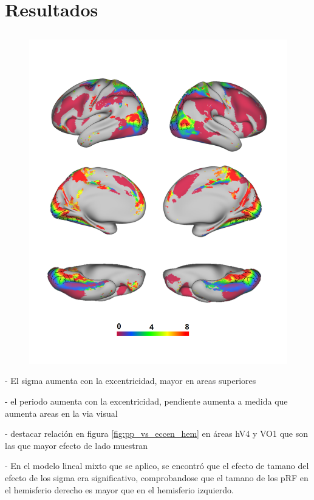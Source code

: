 \chapter{Resultados}\label{chapter:results}

\section{}


\begin{figure}
	\centering		
	\includegraphics[scale=0.3]{images/brain_eccen}
\end{figure}

- El sigma aumenta con la excentricidad, mayor en areas superiores

- el periodo aumenta con la excentricidad, pendiente aumenta a medida que aumenta areas en la via visual

- destacar relaci\'on en figura \ref{fig:pp_vs_eccen_hem} en \'areas hV4 y VO1 que son las que mayor efecto de lado muestran

- En el modelo lineal mixto que se aplico, se encontr\'o que el efecto de tamano del efecto de los sigma era significativo, comprobandose que el tamano de los pRF en el hemisferio derecho es mayor que en el hemisferio izquierdo.

